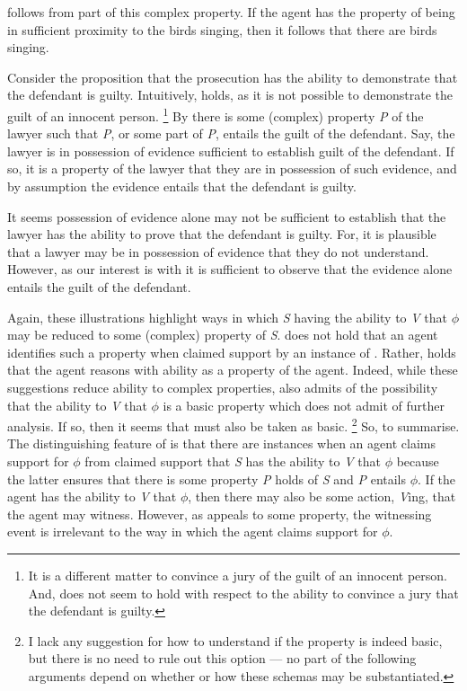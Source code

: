 \begin{note}
\begin{illustration}
     follows from part of this complex property.
    If the agent has the property of being in sufficient proximity to the birds singing, then it follows that there are birds singing.
  \end{illustration}

  \begin{illustration}
    Consider the proposition that the prosecution has the ability to demonstrate that the defendant is guilty.
    Intuitively,  holds, as it is not possible to demonstrate the guilt of an innocent person.\nolinebreak
    \footnote{
      It is a different matter to convince a jury of the guilt of an innocent person.
      And,  does not seem to hold with respect to the ability to convince a jury that the defendant is guilty.
    }
    By \AR{} there is some (complex) property \emph{P} of the lawyer such that \emph{P}, or some part of \emph{P}, entails the guilt of the defendant.
    Say, the lawyer is in possession of evidence sufficient to establish guilt of the defendant.
    If so, it is a property of the lawyer that they are in possession of such evidence, and by assumption the evidence entails that the defendant is guilty.

    It seems possession of evidence alone may not be sufficient to establish that the lawyer has the ability to prove that the defendant is guilty.
    For, it is plausible that a lawyer may be in possession of evidence that they do not understand.
    However, as our interest is with  it is sufficient to observe that the evidence alone entails the guilt of the defendant.
  \end{illustration}

  Again, these illustrations highlight ways in which \emph{S} having the ability to \emph{V} that \(\phi\) may be reduced to some (complex) property of \emph{S}.
  \AR{} does not hold that an agent identifies such a property when claimed support by an instance of .
  Rather, \AR{} holds that the agent reasons with ability as a property of the agent.
  Indeed, while these suggestions reduce ability to complex properties, \AR{} also admits of the possibility that the ability to \emph{V} that \(\phi\) is a basic property which does not admit of further analysis.
  If so, then it seems that  must also be taken as basic.\nolinebreak
  \footnote{
    I lack any suggestion for how to understand \AR{} if the property is indeed basic, but there is no need to rule out this option ---  no part of the following arguments depend on whether or how these schemas may be substantiated.
  }
  So, to summarise.
  The distinguishing feature of \AR{} is that there are instances when an agent claims support for \(\phi\) from claimed support that \emph{S} has the ability to \emph{V} that \(\phi\) because the latter ensures that there is some property \emph{P} holds of \emph{S} and \emph{P} entails \(\phi\).
  If the agent has the ability to \emph{V} that \(\phi\), then there may also be some action, \emph{V}ing, that the agent may witness.
  However, as \AR{} appeals to some property, the witnessing event is irrelevant to the way in which the agent claims support for \(\phi\).
\end{note}

